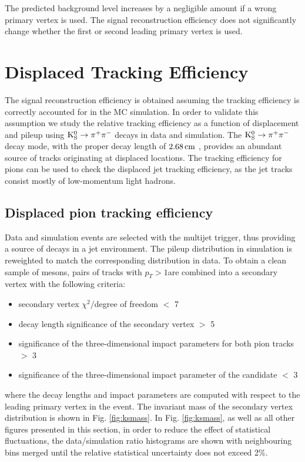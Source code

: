 The predicted background level increases by a negligible amount if a wrong primary vertex is used. The signal reconstruction efficiency 
does not significantly change whether the first or second leading primary vertex is used.

\section{Displaced Tracking Efficiency}

The signal reconstruction efficiency is obtained assuming the tracking efficiency is correctly 
accounted for in the MC simulation. In order to validate this assumption we study
the relative tracking efficiency as a function of displacement and pileup using
$\mathrm{K}^0_\mathrm{S} \to \pi^+\pi^-$ decays in data and simulation.
The $\mathrm{K}^0_\mathrm{S} \to \pi^+\pi^-$ decay mode, with the \Kshort proper decay length of $2.68 \,\text{cm}$
 \cite{Beringer:1900zz}, provides an abundant source of tracks originating
at displaced locations. 
The tracking efficiency for \Kshort pions can be used to check the displaced jet tracking efficiency, 
as the jet tracks consist mostly of low-momentum light hadrons. 

\subsection{Displaced pion tracking efficiency}
\label{subsec:pitrkeff}

Data and simulation events are selected with the multijet trigger, thus providing
a source of \Kshort decays in a jet environment. The pileup distribution in simulation is reweighted
to match the corresponding distribution in data. 
To obtain a clean sample of \Kshort mesons, pairs of tracks with $p_T>1$\GeV are combined
 into a secondary 
vertex with the following criteria:
\begin{itemize}
 \item secondary vertex $\chi^2/$degree of freedom $<$ 7
 \item decay length significance of the secondary vertex $>$ 5
 \item significance of the three-dimensional impact parameters for both pion tracks $>$ 3
 \item significance of the three-dimensional impact parameter of the \Kshort candidate $<$ 3 
\end{itemize}
where the decay lengths and impact parameters are computed with respect to the leading primary vertex
in the event.
The invariant mass of the secondary vertex distribution is shown in Fig. \ref{fig:ksmass}. 
In Fig. \ref{fig:ksmass}, as well as all other figures
presented in this section, in order to reduce the effect of statistical fluctuations, 
the data/simulation ratio histograms are shown with neighbouring bins merged until the
relative statistical uncertainty does not exceed 2\%. 

